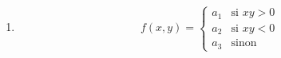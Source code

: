 \begin{exercice}
\begin{multicols}{2}
\begin{enumerate}
	\item 
	\begin{equation}
		f(x,y)=
			\begin{cases}
		a_1	&	\text{si }xy>0\\
		a_2	&	 \text{si }xy<0\\
		a_3	&	 \text{sinon}
	\end{cases}
	\end{equation}
\end{enumerate}
\end{multicols}

\end{exercice}
